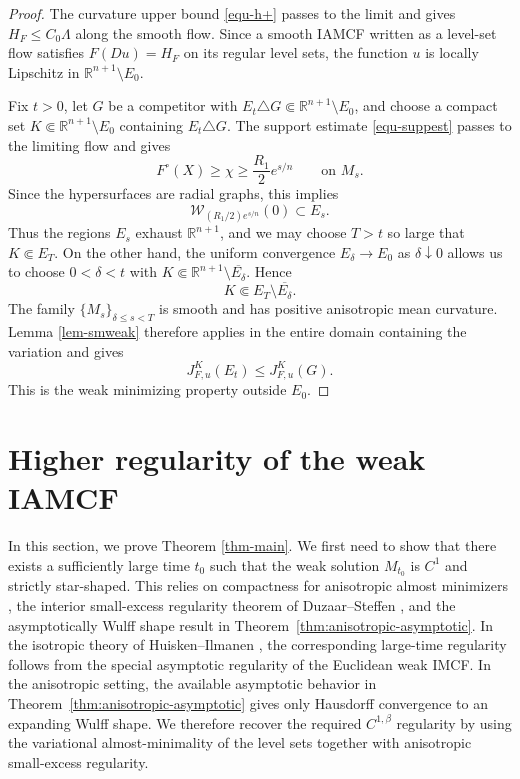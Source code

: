 \documentclass[11pt,reqno]{amsart}
\theoremstyle{definition}
\theoremstyle{remark}
\numberwithin{equation}{section}
\begin{document}
\begin{proof}
	The curvature upper bound \eqref{equ-h+} passes to the limit and gives $H_F\leq C_0\Lambda$ along the smooth flow. Since a smooth IAMCF written as a level-set flow satisfies $F(Du)=H_F$ on its regular level sets, the function $u$ is locally Lipschitz in $\mathbb{R}^{n+1}\setminus E_0$.

	Fix $t>0$, let $G$ be a competitor with $E_t\triangle G\Subset\mathbb{R}^{n+1}\setminus E_0$, and choose a compact set $K\Subset\mathbb{R}^{n+1}\setminus E_0$ containing $E_t\triangle G$. The support estimate \eqref{equ-suppest} passes to the limiting flow and gives
	\begin{equation*}
		F^\circ(X)\geq\chi\geq \frac{R_1}{2}e^{s/n}
		\qquad\text{on }M_s.
	\end{equation*}
	Since the hypersurfaces are radial graphs, this implies
	\begin{equation*}
		\mathcal W_{(R_1/2)e^{s/n}}(0)\subset E_s.
	\end{equation*}
	Thus the regions $E_s$ exhaust $\mathbb R^{n+1}$, and we may choose $T>t$ so large that $K\Subset E_T$. On the other hand, the uniform convergence $E_\delta\to E_0$ as $\delta\downarrow0$ allows us to choose $0<\delta<t$ with $K\Subset\mathbb R^{n+1}\setminus\overline{E_\delta}$. Hence
	\begin{equation*}
		K\Subset E_T\setminus\overline{E_\delta}.
	\end{equation*}
	The family $\{M_s\}_{\delta\leq s<T}$ is smooth and has positive anisotropic mean curvature. Lemma \ref{lem-smweak} therefore applies in the entire domain containing the variation and gives
	\begin{equation*}
		J_{F,u}^K(E_t)\leq J_{F,u}^K(G).
	\end{equation*}
	This is the weak minimizing property outside $E_0$.
\end{proof}



	\section{Higher regularity of the weak IAMCF}
	\label{sec5}
	In this section, we prove Theorem \ref{thm-main}. We first need to show that there exists a sufficiently large time $t_0$ such that the weak solution $M_{t_0}$ is $C^1$ and strictly star-shaped. This relies on compactness for anisotropic almost minimizers \cite{DPM15}, the interior small-excess regularity theorem of Duzaar--Steffen \cite{DS02}, and the asymptotically Wulff shape result in Theorem~\ref{thm:anisotropic-asymptotic}. In the isotropic theory of Huisken--Ilmanen \cite{HI08}, the corresponding large-time regularity follows from the special asymptotic regularity of the Euclidean weak IMCF. In the anisotropic setting, the available asymptotic behavior in Theorem~\ref{thm:anisotropic-asymptotic} gives only Hausdorff convergence to an expanding Wulff shape. We therefore recover the required $C^{1,\beta}$ regularity by using the variational almost-minimality of the level sets together with anisotropic small-excess regularity.
\end{document}
